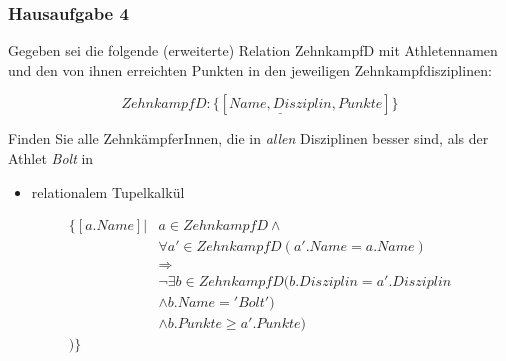 \begin{frame}[fragile]
	\frametitle{Hausaufgabe 4}
	\vspace{0.5cm}

	\begin{multicols}{2}
		Gegeben sei die folgende (erweiterte) Relation ZehnkampfD mit 
		Athletennamen und den von ihnen erreichten Punkten in den jeweiligen Zehnkampfdisziplinen:

		\[ ZehnkampfD: \{[ \underline{Name, Disziplin}, Punkte ]\} \]

		Finden Sie alle ZehnkämpferInnen, die in \textit{allen} Disziplinen besser sind,
		als der Athlet \textit{Bolt} in
		\begin{itemize}
			\item relationalem Tupelkalkül
		\end{itemize}
		\vfill\columnbreak

		\begin{align*}
			\{ [a.Name] | & a \in ZehnkampfD \wedge \\
						  & \forall a' \in ZehnkampfD(a'.Name = a.Name) \\
						  & \Rightarrow \\
						  & \neg \exists b \in ZehnkampfD (b.Disziplin = a'.Disziplin \\
						  & \wedge b.Name = 'Bolt') \\
						  & \wedge b.Punkte \geq a'.Punkte) \\
			) \}
		\end{align*}
	\end{multicols}
\end{frame}

